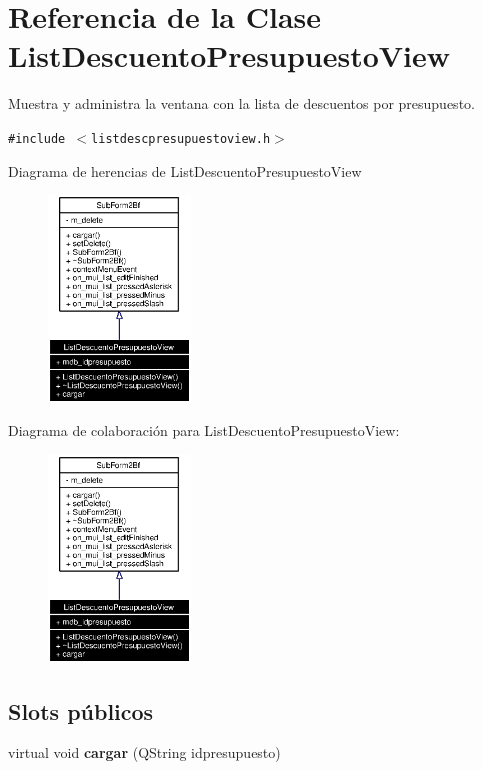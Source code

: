 \section{Referencia de la Clase List\-Descuento\-Presupuesto\-View}
\label{classListDescuentoPresupuestoView}
Muestra y administra la ventana con la lista de descuentos por presupuesto.  


{\tt \#include $<$listdescpresupuestoview.h$>$}

Diagrama de herencias de List\-Descuento\-Presupuesto\-View\begin{figure}[H]
\begin{center}
\leavevmode
\includegraphics[width=107pt]{classListDescuentoPresupuestoView__inherit__graph}
\end{center}
\end{figure}
Diagrama de colaboraci\'{o}n para List\-Descuento\-Presupuesto\-View:\begin{figure}[H]
\begin{center}
\leavevmode
\includegraphics[width=107pt]{classListDescuentoPresupuestoView__coll__graph}
\end{center}
\end{figure}
\subsection*{Slots p\'{u}blicos}
\begin{CompactItemize}
\item 
virtual void {\bf cargar} (QString idpresupuesto)\label{classListDescuentoPresupuestoView_i0}

\end{CompactItemize}
